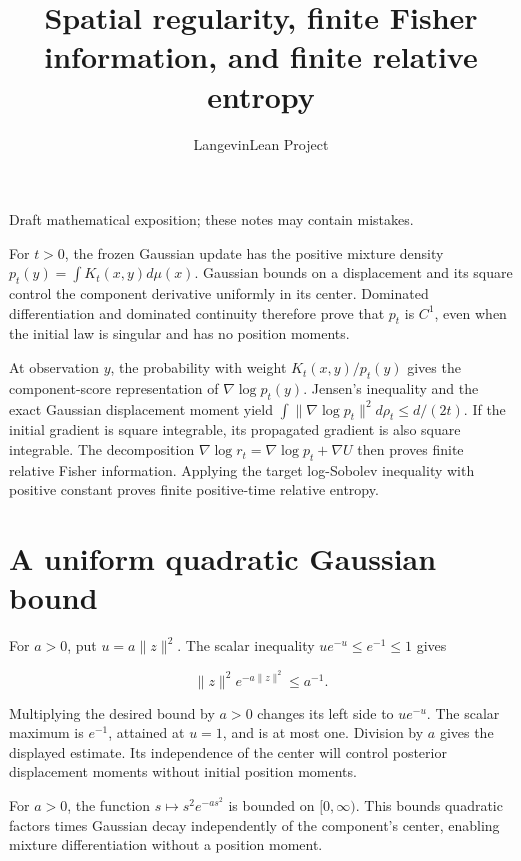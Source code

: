 \documentclass[11pt,a4paper]{article}
\title{\texorpdfstring{Spatial regularity, finite Fisher information, and finite relative entropy}{Spatial regularity, finite Fisher information, and finite relative entropy}}
\author{LangevinLean Project}
\date{}
\begin{document}
\maketitle
Draft mathematical exposition; these notes may contain mistakes.


For \(t>0\), the frozen Gaussian update has the positive mixture density \(p_t(y)=\int K_t(x,y)d\mu(x)\). Gaussian bounds on a displacement and its square control the component derivative uniformly in its center. Dominated differentiation and dominated continuity therefore prove that \(p_t\) is \(C^1\), even when the initial law is singular and has no position moments.



At observation \(y\), the probability with weight \(K_t(x,y)/p_t(y)\) gives the component-score representation of \(\nabla\log p_t(y)\). Jensen's inequality and the exact Gaussian displacement moment yield \(\int\|\nabla\log p_t\|^2d\rho_t\le d/(2t)\). If the initial gradient is square integrable, its propagated gradient is also square integrable. The decomposition \(\nabla\log r_t=\nabla\log p_t+\nabla U\) then proves finite relative Fisher information. Applying the target log-Sobolev inequality with positive constant proves finite positive-time relative entropy.


\section{\texorpdfstring{A uniform quadratic Gaussian bound}{A uniform quadratic Gaussian bound}}


For \(a>0\), put \(u=a\|z\|^2\). The scalar inequality \(u e^{-u}\le e^{-1}\le1\) gives

\[\|z\|^2e^{-a\|z\|^2}\le a^{-1}.\]

Multiplying the desired bound by \(a>0\) changes its left side to \(u e^{-u}\). The scalar maximum is \(e^{-1}\), attained at \(u=1\), and is at most one. Division by \(a\) gives the displayed estimate. Its independence of the center will control posterior displacement moments without initial position moments.



For \(a>0\), the function \(s\mapsto s^2e^{-as^2}\) is bounded on \([0,\infty)\). This bounds quadratic factors times Gaussian decay independently of the component's center, enabling mixture differentiation without a position moment.
\end{document}
